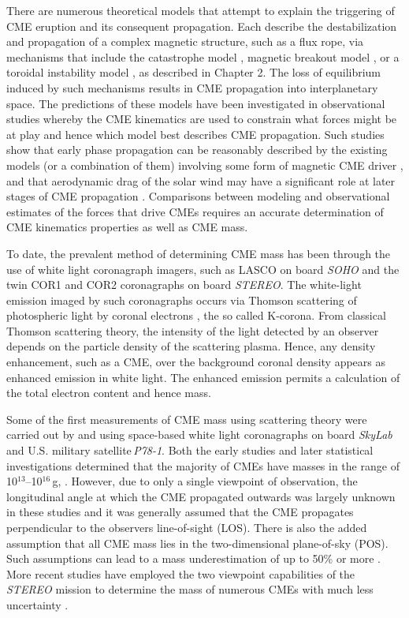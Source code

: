 There are numerous theoretical models that attempt to explain the triggering of CME eruption and its consequent propagation. Each describe the destabilization and propagation of a complex magnetic structure, such as a flux rope, via mechanisms that include the catastrophe model \citep{forbes1991,forbes1995,lin2000}, magnetic breakout model \citep{antio99,lynch2008}, or a toroidal instability model \citep{chen1996,kleim2006}, as described in Chapter 2. The loss of equilibrium induced by such mechanisms results in CME propagation into interplanetary space. The predictions of these models have been investigated in observational studies whereby the CME kinematics are used to constrain what forces might be at play and hence which model best describes CME propagation. Such studies show that early phase propagation can be reasonably described by the existing models (or a combination of them) involving some form of magnetic CME driver \citep{manoh2003, chen2006, schrijver2008c, lin2010}, and that aerodynamic drag of the solar wind may have a significant role at later stages of CME propagation \citep{howard2007, malo10, byrne2010}. Comparisons between modeling and observational estimates of the forces that drive CMEs requires an accurate determination of CME kinematics properties as well as CME mass.

To date, the prevalent method of determining CME mass has been through the use of white light coronagraph imagers, such as LASCO on board \emph{SOHO} and the twin COR1 and COR2 coronagraphs on board \emph{STEREO}. The white-light emission imaged by such coronagraphs occurs via Thomson scattering of photospheric light by coronal electrons \citep{min30, vdeh50, bil66}, the so called K-corona.  From classical Thomson scattering theory, the intensity of the light detected by an observer depends on the particle density of the scattering plasma. Hence, any density enhancement, such as a CME, over the background coronal density appears as enhanced emission in white light. The enhanced emission permits a calculation of the total electron content and hence mass. 

Some of the first measurements of CME mass using scattering theory were carried out by \citet{munro1979} and \citet{poland1981} using space-based white light coronagraphs on board \emph{SkyLab} and U.S. military satellite\,\emph{P78-1}.  Both the early studies  and later statistical investigations determined that the majority of CMEs have masses in the range of 10$^{13}$--10$^{16}$\,g, \citep{vourlidas02, vour2010}. However, due to only a single viewpoint of observation, the longitudinal angle at which the CME propagated outwards was largely unknown in these studies 
and it was generally assumed that the CME propagates perpendicular to the observers line-of-sight (LOS). There is also the added assumption that all CME mass lies in the two-dimensional plane-of-sky (POS). Such assumptions can lead to a mass underestimation of up to 50\% or more \citep{vou00}. More recent studies have employed the two viewpoint capabilities of the \emph{STEREO} mission to determine the mass of numerous 
CMEs with much less uncertainty \citep{cola09}. 
	
